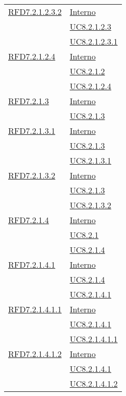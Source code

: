 \begin{longtable}{|>{\centering}m{5cm}|m{5cm}<{\centering}|}
\hyperlink{RFD7.2.1.2.3.2}{RFD7.2.1.2.3.2} & \hyperlink{Interno}{Interno}\\
& \hyperref[UC8.2.1.2.3]{UC8.2.1.2.3}\\
& \hyperref[UC8.2.1.2.3.1]{UC8.2.1.2.3.1}\\ \hline

\hyperlink{RFD7.2.1.2.4}{RFD7.2.1.2.4} & \hyperlink{Interno}{Interno}\\
& \hyperref[UC8.2.1.2]{UC8.2.1.2}\\
& \hyperref[UC8.2.1.2.4]{UC8.2.1.2.4}\\ \hline

\hyperlink{RFD7.2.1.3}{RFD7.2.1.3} & \hyperlink{Interno}{Interno}\\
& \hyperref[UC8.2.1.3]{UC8.2.1.3}\\ \hline

\hyperlink{RFD7.2.1.3.1}{RFD7.2.1.3.1} & \hyperlink{Interno}{Interno}\\
& \hyperref[UC8.2.1.3]{UC8.2.1.3}\\
& \hyperref[UC8.2.1.3.1]{UC8.2.1.3.1}\\ \hline

\hyperlink{RFD7.2.1.3.2}{RFD7.2.1.3.2} & \hyperlink{Interno}{Interno}\\
& \hyperref[UC8.2.1.3]{UC8.2.1.3}\\
& \hyperref[UC8.2.1.3.2]{UC8.2.1.3.2}\\ \hline

\hyperlink{RFD7.2.1.4}{RFD7.2.1.4} & \hyperlink{Interno}{Interno}\\
& \hyperref[UC8.2.1]{UC8.2.1}\\
& \hyperref[UC8.2.1.4]{UC8.2.1.4}\\ \hline

\hyperlink{RFD7.2.1.4.1}{RFD7.2.1.4.1} & \hyperlink{Interno}{Interno}\\
& \hyperref[UC8.2.1.4]{UC8.2.1.4}\\
& \hyperref[UC8.2.1.4.1]{UC8.2.1.4.1}\\ \hline

\hyperlink{RFD7.2.1.4.1.1}{RFD7.2.1.4.1.1} & \hyperlink{Interno}{Interno}\\
& \hyperref[UC8.2.1.4.1]{UC8.2.1.4.1}\\
& \hyperref[UC8.2.1.4.1.1]{UC8.2.1.4.1.1}\\ \hline

\hyperlink{RFD7.2.1.4.1.2}{RFD7.2.1.4.1.2} & \hyperlink{Interno}{Interno}\\
& \hyperref[UC8.2.1.4.1]{UC8.2.1.4.1}\\
& \hyperref[UC8.2.1.4.1.2]{UC8.2.1.4.1.2}\\ \hline


\end{longtable}
